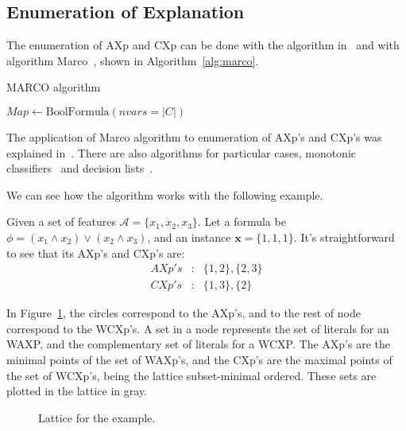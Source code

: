 
\subsection{Enumeration of Explanation}

The enumeration of AXp and CXp can be done with the algorithm in~\cite{MSGCIN20}
and with algorithm Marco~\cite{LiffitonM13}, shown in Algorithm~\ref{alg:marco}.

\begin{algorithm}
    \caption{MARCO algorithm}\label{alg:marco}
    $Map \gets \text{BoolFormula}(nvars = |C|)$ 
\end{algorithm}

The application of Marco algorithm to enumeration of AXp's and CXp's was 
explained in~\cite{IgnatievNA020}.
There are also algorithms for particular cases, monotonic classifiers~\cite{MarquesSilvaGCIN21} and decision lists~\cite{IgnatievS21}.

We can see how the algorithm works with the following example.

\begin{example}
    Given a set of features $\mathcal{A} = \{x_1, x_2, x_3\}$.
    Let a formula be
    $\phi = (x_1 \land x_2) \lor (x_2 \land x_3)$, 
    and an instance $\mathbf{x} = \{1, 1, 1\}$.
    It's straightforward to see 
    that its AXp's and CXp's are:
    \begin{eqnarray*}
    AXp's &:& \{ 1, 2 \}, \{ 2, 3 \} \\
    CXp's &:& \{1, 3\}, \{2\}
    \end{eqnarray*}

    In  Figure~\ref{fig:lattice1}, the circles correspond to the AXp's, 
    and to the rest of node correspond to the WCXp's. 
    A set in a node represents the set of literals for an WAXP, 
    and the complementary set of literals for a WCXP.
    The AXp's are the minimal points of the set of WAXp's, 
    and the CXp's are the maximal points of the set of WCXp's,
    being the lattice subset-minimal ordered.
    These sets are plotted in the lattice in gray.

    \begin{figure}
        \begin{center}
        
        \end{center}
    \caption{Lattice for the example.}\label{fig:lattice1}
    \end{figure}

\end{example}
